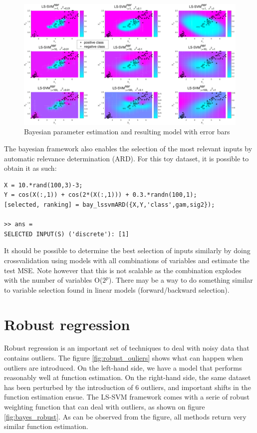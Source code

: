 \documentclass[11pt, a4paper]{article}
\begin{document}
\begin{figure}[H]
    \centering
    \includegraphics[scale=.40]{bayes_iris.pdf}
    \caption{Bayesian parameter estimation and resulting model with error bars}
    \label{fig:bayes_iris}
\end{figure}

The bayesian framework also enables the selection of the most relevant
inputs by automatic relevance determination (ARD). For this toy
dataset, it is possible to obtain it as such:

\begin{lstlisting}
X = 10.*rand(100,3)-3;
Y = cos(X(:,1)) + cos(2*(X(:,1))) + 0.3.*randn(100,1);
[selected, ranking] = bay_lssvmARD({X,Y,'class',gam,sig2});

>> ans =
SELECTED INPUT(S) ('discrete'): [1]
\end{lstlisting}

It should be possible to determine the best selection of inputs
similarly by doing crossvalidation using models with all combinations
of variables and estimate the test MSE. Note however that this is not
scalable as the combination explodes with the number of variables
O($2^p$). There may be a way to do something similar to variable
selection found in linear models (forward/backward selection).

\section{Robust regression}

Robust regression is an important set of techniques to deal with noisy
data that contains outliers. The figure \ref{fig:robust_ouliers} shows
what can happen when outliers are introduced. On the left-hand side,
we have a model that performs reasonably well at function
estimation. On the right-hand side, the same dataset has been
perturbed by the introduction of 6 outliers, and important shifts in
the function estimation ensue. The LS-SVM framework comes with a serie
of robust weighting function that can deal with outliers, as shown on
figure \ref{fig:bayes_robust}. As can be observed from the figure, all
methods return very similar function estimation.
\end{document}
